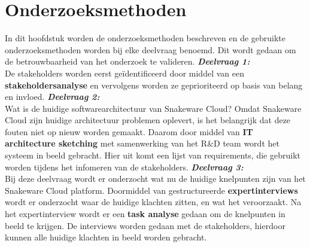 \section{Onderzoeksmethoden}
In dit hoofdstuk worden de onderzoeksmethoden beschreven en de gebruikte onderzoeksmethoden worden bij elke deelvraag benoemd.
Dit wordt gedaan om de betrouwbaarheid van het onderzoek te valideren.
\whitespace
\textit{\textbf{Deelvraag 1:} \SubquestionOne} \\
De stakeholders worden eerst geïdentificeerd door middel van een \textbf{stakeholdersanalyse} en vervolgens worden ze geprioriteerd op basis van belang en invloed.
\whitespace
\textit{\textbf{Deelvraag 2:} \SubquestionTwo} \\
Wat is de huidige softwarearchitectuur van Snakeware Cloud?
Omdat Snakeware Cloud zijn huidige architectuur problemen oplevert, is het belangrijk dat deze fouten niet op nieuw worden gemaakt.
Daarom door middel van \textbf{IT architecture sketching} met samenwerking van het R\&D team wordt het systeem in beeld gebracht.
Hier uit komt  een lijst van requirements, die gebruikt worden tijdens het infomeren van de stakeholders.
\whitespace
\textit{\textbf{Deelvraag 3:} \SubquestionThree} \\
Bij deze deelvraag wordt er onderzocht wat nu de huidige knelpunten zijn van het Snakeware Cloud platform.
Doormiddel van gestructureerde \textbf{expertinterviews} wordt er onderzocht waar de huidige klachten zitten, en wat het veroorzaakt.
Na het expertinterview wordt er een \textbf{task analyse} gedaan om de knelpunten in beeld te krijgen.
De interviews worden gedaan met de stakeholders, hierdoor kunnen alle huidige klachten in beeld worden gebracht.
\whitespace

